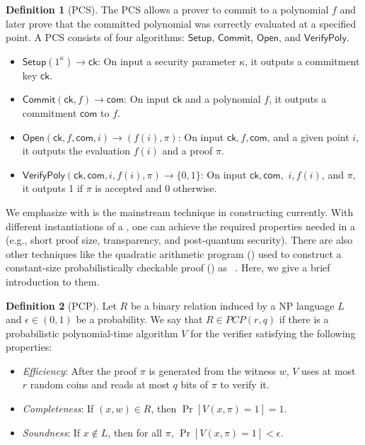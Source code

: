 \documentclass[letterpaper,twocolumn,10pt]{article}
\theoremstyle{definition}
\newtheorem{definition}{Definition}[section]
\newcommand{\zk}{\text{zk-SNARK}\xspace}
\newcommand{\PCP}{\text{PCP}\xspace}
\newcommand{\new}[1]{{#1}\xspace}
\begin{document}
\begin{definition}[PCS]
	{The PCS allows a prover to commit to a polynomial $f$ %
		and later prove that the committed polynomial was correctly evaluated at a specified point. A PCS consists of four algorithms: $\textsf{Setup}$, $\textsf{Commit}$, $\textsf{Open}$, and $\textsf{VerifyPoly}$.
		\begin{itemize}[noitemsep, topsep=2pt, partopsep=0pt,leftmargin=0.4cm]
			\item $\textsf{Setup}(1^{\kappa})\rightarrow\textsf{ck}$: On input a security parameter $\kappa$, it outputs a commitment key $\textsf{ck}$.
			
			\item $\textsf{Commit}(\textsf{ck},f)\rightarrow\textsf{com}$: On input $\textsf{ck}$ and a polynomial $f$, it outputs a commitment $\textsf{com}$ to $f$.
			
			\item $\textsf{Open}(\textsf{ck},f,\textsf{com},i)\rightarrow {(f(i),\pi)}$: On input $\textsf{ck},f,\textsf{com}$, and a given point $i$, it outputs the evaluation $f(i)$ and a proof $\pi$.
			
			\item $\textsf{VerifyPoly}(\textsf{ck},\textsf{com},i,f(i),\pi)\rightarrow\{0,1\}$: On input $\textsf{ck},\textsf{com},$ $i,f(i)$, and $\pi$, it outputs 1 if $\pi$ is accepted and 0 otherwise.
	\end{itemize}}
\end{definition}

We emphasize  with  is the mainstream technique in constructing \zk currently. With different instantiations of a , one can achieve the required properties needed in a \zk (e.g., short proof size, transparency, and post-quantum security). \new{There are also other techniques like the quadratic arithmetic program (\text{QAP}) used to construct a constant-size probabilistically checkable proof (\PCP) as \zk ~\cite{gennaro2013quadratic}. Here, we give a brief introduction to them.}

\new{
	\begin{definition}[PCP]
		\label{PCP}
		Let $R$ be a binary relation induced by a NP language $L$ and $\epsilon\in (0,1)$ be a probability. We say that $R\in PCP(r,q)$ if there is a probabilistic polynomial-time algorithm $V$ for the verifier satisfying the following properties:
		\begin{itemize}[noitemsep, topsep=2pt, partopsep=0pt,leftmargin=0.4cm]
			\item \textit{Efficiency}: After the proof $\pi$ is generated from the witness $w$, $V$ uses at most $r$ random coins and reads at most $q$ bits of $\pi$ to verify it.
			\item \textit{Completeness}: If $(x,w)\in R$, then $\Pr[V(x,\pi)=1]=1$.
			\item \textit{Soundness}: If $x\notin L$, then for all $\pi$, $\Pr[V(x,\pi)=1]<\epsilon$.
		\end{itemize}
	\end{definition}
}
\end{document}

